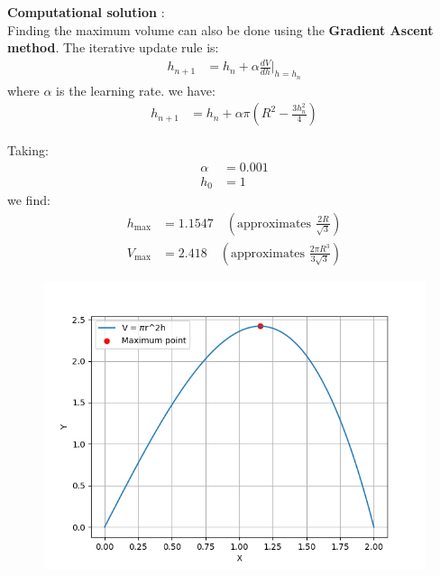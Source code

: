 \documentclass[journal]{IEEEtran}
\begin{document}
\textbf{Computational solution} : \\

Finding the maximum volume can also be done using the \textbf{Gradient Ascent method}. The iterative update rule is:
\begin{align}
    h_{n+1} &= h_n + \alpha \frac{dV}{dh}\Big|_{h=h_n}
\end{align}
where $\alpha$ is the learning rate. we have:
\begin{align}
    h_{n+1} &= h_n + \alpha \pi \left( R^2 - \frac{3h_n^2}{4} \right)
\end{align}

Taking:
\begin{align}
    \alpha &= 0.001 \\
    h_0 &= 1
\end{align}
we find:
\begin{align}
    h_{\text{max}} &= 1.1547 \quad (\text{approximates } \frac{2R}{\sqrt{3}}) \\
    V_{\text{max}} &= 2.418 \quad (\text{approximates } \frac{2\pi R^3}{3\sqrt{3}})
\end{align}

\begin{figure}[h]
\centering
\includegraphics[width=\columnwidth]{figs/fig.png}
\label{fig:Plot1} 
\end{figure}
\end{document}
